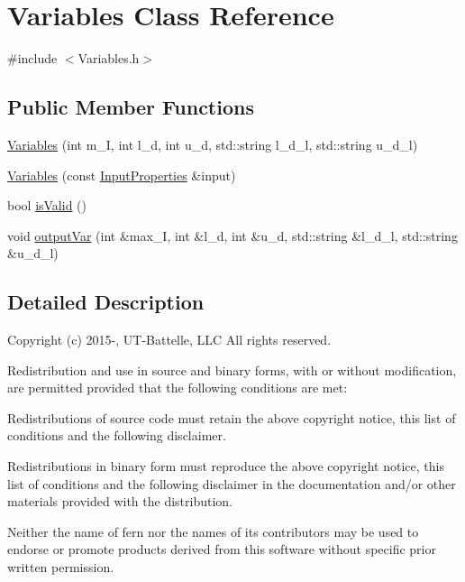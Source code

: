 \hypertarget{a00642}{}\section{Variables Class Reference}
\label{a00642}


{\ttfamily \#include $<$Variables.\+h$>$}

\subsection*{Public Member Functions}
\begin{DoxyCompactItemize}
\item 
\hyperlink{a00642_a94121a99ac19ea779219504de0253c9a}{Variables} (int m\+\_\+I, int l\+\_\+d, int u\+\_\+d, std\+::string l\+\_\+d\+\_\+l, std\+::string u\+\_\+d\+\_\+l)
\item 
\hyperlink{a00642_a66bbfb4d63737e90ece8511402e594d0}{Variables} (const \hyperlink{a00634}{Input\+Properties} \&input)
\item 
bool \hyperlink{a00642_af81f777f4eac8f6ac44791bdea009d1a}{is\+Valid} ()
\item 
void \hyperlink{a00642_ad66b5ab4971f5f66b2c5db102b22c4ae}{output\+Var} (int \&max\+\_\+I, int \&l\+\_\+d, int \&u\+\_\+d, std\+::string \&l\+\_\+d\+\_\+l, std\+::string \&u\+\_\+d\+\_\+l)
\end{DoxyCompactItemize}


\subsection{Detailed Description}


 Copyright (c) 2015-\/, U\+T-\/\+Battelle, L\+LC All rights reserved.

Redistribution and use in source and binary forms, with or without modification, are permitted provided that the following conditions are met\+:

Redistributions of source code must retain the above copyright notice, this list of conditions and the following disclaimer.

Redistributions in binary form must reproduce the above copyright notice, this list of conditions and the following disclaimer in the documentation and/or other materials provided with the distribution.

Neither the name of fern nor the names of its contributors may be used to endorse or promote products derived from this software without specific prior written permission.

